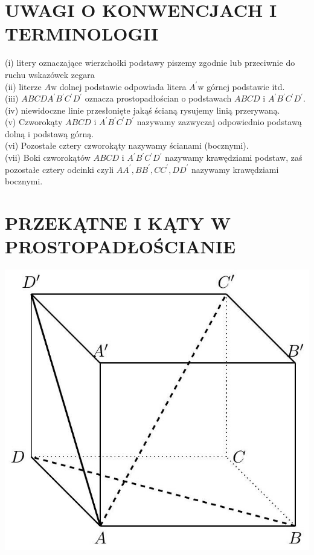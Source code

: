 \documentclass[10pt]{article}
\begin{document}
\section*{UWAGI O KONWENCJACH I TERMINOLOGII}
(i) litery oznaczające wierzchołki podstawy piszemy zgodnie lub przeciwnie do ruchu wskazówek zegara\\
(ii) literze \(A \mathrm{w}\) dolnej podstawie odpowiada litera \(A^{\prime} \mathrm{w}\) górnej podstawie itd.\\
(iii) \(A B C D A^{\prime} B^{\prime} C^{\prime} D^{\prime}\) oznacza prostopadłościan o podstawach \(A B C D\) i \(A^{\prime} B^{\prime} C^{\prime} D^{\prime}\).\\
(iv) niewidoczne linie przesłonięte jakąś ścianą rysujemy linią przerywaną.\\
(v) Czworokąty \(A B C D\) i \(A^{\prime} B^{\prime} C^{\prime} D^{\prime}\) nazywamy zazwyczaj odpowiednio podstawą dolną i podstawą górną.\\
(vi) Pozostałe cztery czworokąty nazywamy ścianami (bocznymi).\\
(vii) Boki czworokątów \(A B C D\) i \(A^{\prime} B^{\prime} C^{\prime} D^{\prime}\) nazywamy krawędziami podstaw, zaś pozostałe cztery odcinki czyli \(A A^{\prime}, B B^{\prime}, C C^{\prime}, D D^{\prime}\) nazywamy krawędziami bocznymi.

\section*{PRZEKĄTNE I KĄTY W PROSTOPADŁOŚCIANIE}
\begin{center}
\includegraphics[max width=\textwidth]{2024_11_21_e9b4faa005d5be2cc318g-071}
\end{center}
\end{document}
